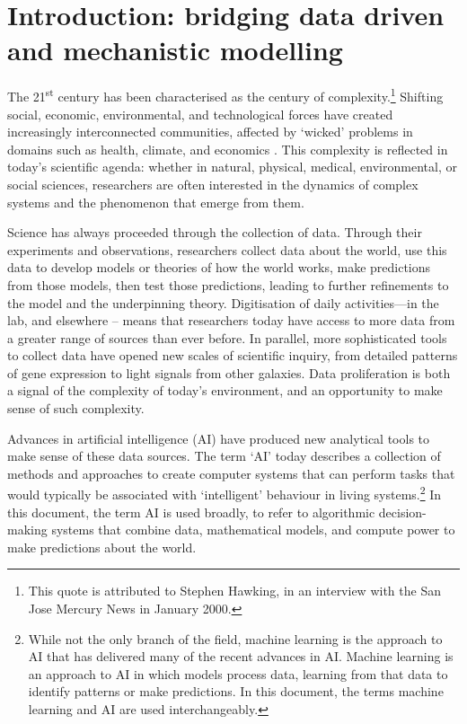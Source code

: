 \section{Introduction: bridging data driven and mechanistic
modelling}\label{introduction-bridging-data-driven-and-mechanistic-modelling}

The 21\textsuperscript{st} century has been characterised as the century
of complexity.\footnote{This quote is attributed to Stephen Hawking, in
  an interview with the San Jose Mercury News in January 2000.} Shifting
social, economic, environmental, and technological forces have created
increasingly interconnected communities, affected by `wicked' problems
in domains such as health, climate, and economics \cite{Rittel-dilemmas73}. This complexity is reflected in today's scientific
agenda: whether in natural, physical, medical, environmental, or social
sciences, researchers are often interested in the dynamics of complex
systems and the phenomenon that emerge from them.

Science has always proceeded through the collection of data. Through
their experiments and observations, researchers collect data about the
world, use this data to develop models or theories of how the world
works, make predictions from those models, then test those predictions,
leading to further refinements to the model and the underpinning theory.
Digitisation of daily activities---in the lab, and elsewhere -- means
that researchers today have access to more data from a greater range of
sources than ever before. In parallel, more sophisticated tools to
collect data have opened new scales of scientific inquiry, from detailed
patterns of gene expression to light signals from other galaxies. Data
proliferation is both a signal of the complexity of today's environment,
and an opportunity to make sense of such complexity.

Advances in artificial intelligence (AI) have produced new analytical
tools to make sense of these data sources. The term `AI' today describes
a collection of methods and approaches to create computer systems that
can perform tasks that would typically be associated with `intelligent'
behaviour in living systems.\footnote{While not the only branch of the
  field, machine learning is the approach to AI that has delivered many
  of the recent advances in AI. Machine learning is an approach to AI in
  which models process data, learning from that data to identify
  patterns or make predictions. In this document, the terms machine
  learning and AI are used interchangeably.} In this document, the term
AI is used broadly, to refer to algorithmic decision-making systems that
combine data, mathematical models, and compute power to make predictions
about the world.

